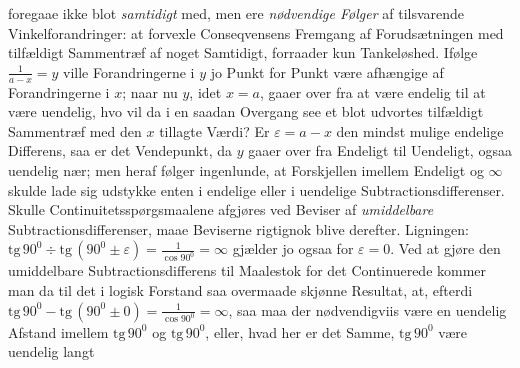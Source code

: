 \documentclass[12pt,a4paper]{book}
\begin{document}
foregaae ikke blot \emph{samtidigt} med, men ere \emph{nødvendige
Følger} af tilsvarende Vinkelforandringer: at forvexle Conseqvensens
Fremgang af Forudsætningen med tilfældigt Sammentræf af noget
Samtidigt, forraader kun Tankeløshed. Ifølge $\frac{1}{a-x} = y$ ville
Forandringerne i $y$ jo Punkt for Punkt være afhængige af
Forandringerne i $x$; naar nu $y$, idet $x = a$, gaaer over fra at være
endelig til at være uendelig, hvo vil da i en saadan Overgang see et
blot udvortes tilfældigt Sammentræf med den $x$ tillagte Værdi? Er
$\varepsilon = a - x$ den mindst mulige endelige Differens, saa er det
Vendepunkt, da $y$ gaaer over fra Endeligt til Uendeligt, ogsaa
uendelig nær; men heraf følger ingenlunde, at Forskjellen imellem
Endeligt og $\infty$ skulde lade sig udstykke enten i endelige eller i
uendelige Subtractionsdifferenser. Skulle Continuitetsspørgsmaalene
afgjøres ved Beviser af \emph{umiddelbare} Subtractionsdifferenser,
maae Beviserne rigtignok blive derefter. Ligningen:
$\mathrm{tg}\,90^{0} \div \mathrm{tg}\,(90^{0} \pm \varepsilon) =
\frac{1}{\cos 90^{0}} = \infty$
\setcounter{footnote}{0}
gjælder jo ogsaa for $\varepsilon = 0$. Ved at gjøre den umiddelbare
Subtractionsdifferens til Maalestok for det Continuerede kommer man da
til det i logisk Forstand saa overmaade skjønne Resultat, at, efterdi
$\mathrm{tg}\,90^{0} - \mathrm{tg}\,(90^{0} \pm 0) =
\frac{1}{\cos 90^{0}} = \infty$, saa maa der nødvendigviis være en
uendelig Afstand imellem $\mathrm{tg}\,90^{0}$ og $\mathrm{tg}\,90^{0}$,
eller, hvad her er det Samme, $\mathrm{tg}\,90^{0}$ være uendelig langt
\end{document}
